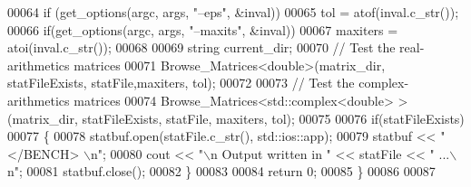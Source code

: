 \begin{DoxyCode}
00064   \textcolor{keywordflow}{if} (get\_options(argc, args, \textcolor{stringliteral}{"--eps"}, &inval))
00065     tol = atof(inval.c\_str()); 
00066   \textcolor{keywordflow}{if}(get\_options(argc, args, \textcolor{stringliteral}{"--maxits"}, &inval))
00067     maxiters = atoi(inval.c\_str()); 
00068   
00069   \textcolor{keywordtype}{string} current\_dir; 
00070   \textcolor{comment}{// Test the real-arithmetics matrices}
00071   Browse\_Matrices<double>(matrix\_dir, statFileExists, statFile,maxiters, tol);
00072   
00073   \textcolor{comment}{// Test the complex-arithmetics matrices}
00074   Browse\_Matrices<std::complex<double> >(matrix\_dir, statFileExists, statFile, maxiters, tol); 
00075   
00076   \textcolor{keywordflow}{if}(statFileExists)
00077   \{
00078     statbuf.open(statFile.c\_str(), std::ios::app); 
00079     statbuf << \textcolor{stringliteral}{"</BENCH> \(\backslash\)n"};
00080     cout << \textcolor{stringliteral}{"\(\backslash\)n Output written in "} << statFile << \textcolor{stringliteral}{" ...\(\backslash\)n"};
00081     statbuf.close();
00082   \}
00083 
00084   \textcolor{keywordflow}{return} 0;
00085 \}
00086 
00087       
\end{DoxyCode}
